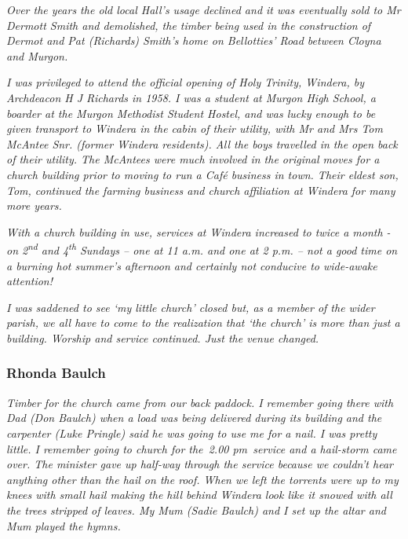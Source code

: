 \emph{Over the years the old local Hall's usage declined and it was eventually sold to Mr Dermott Smith and demolished, the timber being used in the construction of Dermot and Pat (Richards) Smith's home on Bellotties' Road between Cloyna and Murgon.}



\emph{I was privileged to attend the official opening of Holy Trinity, Windera, by Archdeacon H J Richards in 1958. I was a student at Murgon High School, a boarder at the Murgon Methodist Student Hostel, and was lucky enough to be given transport to Windera in the cabin of their utility, with Mr and Mrs Tom McAntee Snr. (former Windera residents). All the boys travelled in the open back of their utility. The McAntees were much involved in the original moves for a church building prior to moving to run a Café business in town. Their eldest son, Tom, continued the farming business and church affiliation at Windera for many more years.}



\emph{With a church building in use, services at Windera increased to twice a month - on 2\textsuperscript{nd} and 4\textsuperscript{th} Sundays -- one at 11 a.m. and one at 2 p.m. -- not a good time on a burning hot summer's afternoon and certainly not conducive to wide-awake attention!}



\emph{I was saddened to see `my little church' closed but, as a member of the wider parish, we all have to come to the realization that `the church' is more than just a building. Worship and service continued. Just the venue changed.}



\subsubsection{Rhonda Baulch}



\emph{Timber for the church came from our back paddock. I remember going there with Dad (Don Baulch) when a load was being delivered during its building and the carpenter (Luke Pringle) said he was going to use me for a nail. I was pretty little. I remember going to church for the~2.00 pm~service and a hail-storm came over. The minister gave up half-way through the service because we couldn't hear anything other than the hail on the roof. When we left the torrents were up to my knees with small hail making the hill behind Windera look like it snowed with all the trees stripped of leaves. My Mum (Sadie Baulch) and I set up the altar and Mum played the hymns.}



